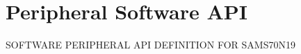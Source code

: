 \hypertarget{group__SAMS70N19__api}{}\section{Peripheral Software A\+PI}
\label{group__SAMS70N19__api}
S\+O\+F\+T\+W\+A\+RE P\+E\+R\+I\+P\+H\+E\+R\+AL A\+PI D\+E\+F\+I\+N\+I\+T\+I\+ON F\+OR S\+A\+M\+S70\+N19 